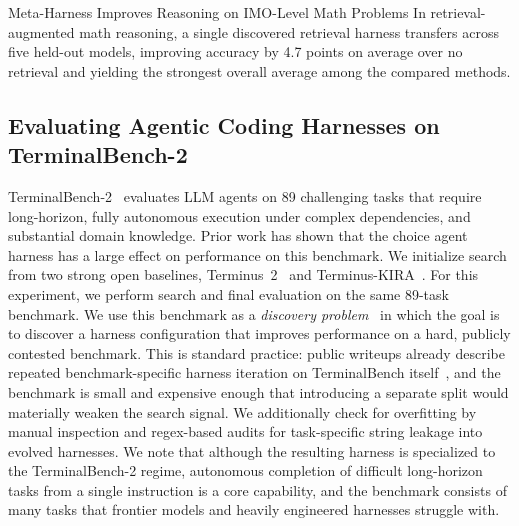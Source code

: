 \vspace{2mm}
\begin{takeawaybox}{Meta-Harness Improves Reasoning on IMO-Level Math Problems}
In retrieval-augmented math reasoning, a single discovered retrieval harness transfers across five held-out models, improving accuracy by 4.7 points on average over no retrieval and yielding the strongest overall average among the compared methods.
\end{takeawaybox}

\subsection{Evaluating Agentic Coding Harnesses on TerminalBench-2}
\label{subsec:terminalbench}

TerminalBench-2~\citep{merrill2026terminal} evaluates LLM agents on 89 challenging tasks that require long-horizon, fully autonomous execution under complex dependencies, and substantial domain knowledge.
Prior work has shown that the choice agent harness has a large effect on performance on this benchmark.
We initialize search from two strong open baselines, Terminus~2~\citep{merrill2026terminal} and Terminus-KIRA~\citep{terminuskira2026}.
For this experiment, we perform search and final evaluation on the same 89-task benchmark.
We use this benchmark as a \textit{discovery problem}~\citep{yuksekgonul2026learningdiscovertesttime} in which the goal is to discover a harness configuration that improves performance on a hard, publicly contested benchmark.
This is standard practice: public writeups already describe repeated benchmark-specific harness iteration on TerminalBench itself~\citep{forgecode_benchmarks_dont_matter,warp_terminal_bench,terminuskira2026}, and the benchmark is small and expensive enough that introducing a separate split would materially weaken the search signal.
We additionally check for overfitting by manual inspection and regex-based audits for task-specific string leakage into evolved harnesses.
We note that although the resulting harness is specialized to the TerminalBench-2 regime, autonomous completion of difficult long-horizon tasks from a single instruction is a core capability, and the benchmark consists of many tasks that frontier models and heavily engineered harnesses struggle with.

